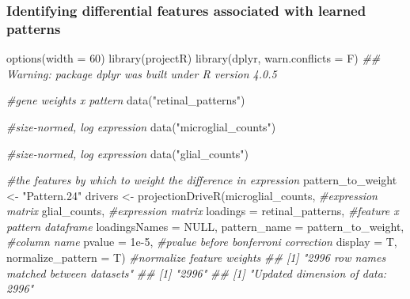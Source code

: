 \documentclass[]{article}
\newcommand{\hlnum}[1]{\textcolor[rgb]{0.816,0.125,0.439}{#1}}%
\newcommand{\hlstr}[1]{\textcolor[rgb]{0.251,0.627,0.251}{#1}}%
\newcommand{\hlcom}[1]{\textcolor[rgb]{0.502,0.502,0.502}{\textit{#1}}}%
\newcommand{\hlstd}[1]{\textcolor[rgb]{0.251,0.251,0.251}{#1}}%
\newcommand{\hlkwc}[1]{\textcolor[rgb]{0.251,0.251,0.251}{#1}}%
\newcommand{\hlkwd}[1]{\textcolor[rgb]{0.878,0.439,0.125}{#1}}%
\newenvironment{Shaded}{\begin{myshaded}}{\end{myshaded}}
\newcommand{\KeywordTok}[1]{\hlkwd{#1}}
\newcommand{\DataTypeTok}[1]{\hlkwc{#1}}
\newcommand{\DecValTok}[1]{\hlnum{#1}}
\newcommand{\FloatTok}[1]{\hlnum{#1}}
\newcommand{\StringTok}[1]{\hlstr{#1}}
\newcommand{\CommentTok}[1]{\hlcom{#1}}
\newcommand{\OtherTok}[1]{{#1}}
\newcommand{\NormalTok}[1]{\hlstd{#1}}
\begin{document}
\hypertarget{identifying-differential-features-associated-with-learned-patterns}{%
\subsubsection{Identifying differential features associated with learned patterns}\label{identifying-differential-features-associated-with-learned-patterns}}

\begin{Shaded}
\begin{Highlighting}[]
\KeywordTok{options}\NormalTok{(}\DataTypeTok{width =} \DecValTok{60}\NormalTok{)}
\KeywordTok{library}\NormalTok{(projectR)}
\KeywordTok{library}\NormalTok{(dplyr, }\DataTypeTok{warn.conflicts =}\NormalTok{ F)}
\CommentTok{\#\# Warning: package \textquotesingle{}dplyr\textquotesingle{} was built under R version 4.0.5}

\CommentTok{\#gene weights x pattern}
\KeywordTok{data}\NormalTok{(}\StringTok{"retinal\_patterns"}\NormalTok{)}

\CommentTok{\#size{-}normed, log expression}
\KeywordTok{data}\NormalTok{(}\StringTok{"microglial\_counts"}\NormalTok{)}

\CommentTok{\#size{-}normed, log expression}
\KeywordTok{data}\NormalTok{(}\StringTok{"glial\_counts"}\NormalTok{)}

\CommentTok{\#the features by which to weight the difference in expression }
\NormalTok{pattern\_to\_weight <{-}}\StringTok{ "Pattern.24"}
\NormalTok{drivers <{-}}\StringTok{ }\KeywordTok{projectionDriveR}\NormalTok{(microglial\_counts, }\CommentTok{\#expression matrix}
\NormalTok{                                       glial\_counts, }\CommentTok{\#expression matrix}
                                       \DataTypeTok{loadings =}\NormalTok{ retinal\_patterns, }\CommentTok{\#feature x pattern dataframe}
                                       \DataTypeTok{loadingsNames =} \OtherTok{NULL}\NormalTok{,}
                                       \DataTypeTok{pattern\_name =}\NormalTok{ pattern\_to\_weight, }\CommentTok{\#column name}
                                       \DataTypeTok{pvalue =} \FloatTok{1e{-}5}\NormalTok{, }\CommentTok{\#pvalue before bonferroni correction}
                                       \DataTypeTok{display =}\NormalTok{ T,}
                                       \DataTypeTok{normalize\_pattern =}\NormalTok{ T) }\CommentTok{\#normalize feature weights}
\CommentTok{\#\# [1] "2996 row names matched between datasets"}
\CommentTok{\#\# [1] "2996"}
\CommentTok{\#\# [1] "Updated dimension of data: 2996"}
\end{Highlighting}
\end{Shaded}
\end{document}
